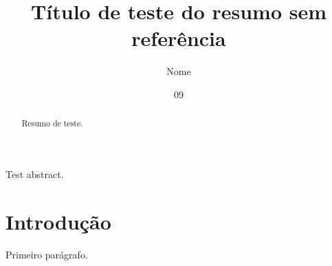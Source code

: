 \documentclass[dsc,resumosemreferencia]{ufrj}
\title{Título de teste do resumo sem referência}
\author{Nome}{de Teste}
\date{09}{2026}
\begin{document}
  \maketitle
  \frontmatter
  \begin{abstract}
    Resumo de teste.
  \end{abstract}
  \begin{foreignabstract}
    Test abstract.
  \end{foreignabstract}
  \tableofcontents
  \mainmatter
  \chapter{Introdução}
    Primeiro parágrafo.
\end{document}

